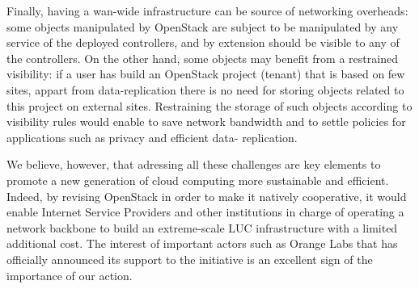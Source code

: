 Finally, having a wan-wide infrastructure can be source of networking overheads: some objects
manipulated by OpenStack are subject to be manipulated by any service of the deployed
controllers, and by extension should be visible to any of the controllers. On the other
hand, some objects may benefit from a restrained visibility: if a user has build an
OpenStack project (tenant) that is based on few sites, appart from data-replication there
is no need for storing objects related to this project on external sites. Restraining the
storage of such objects according to visibility rules would enable to save network
bandwidth and to settle policies for applications such as privacy and efficient data-
replication.

We believe, however, that adressing all these challenges are key
elements to promote a new generation of cloud computing more
sustainable and efficient. Indeed, by revising OpenStack in order to
make it natively cooperative, it would enable Internet Service Providers and other
institutions in charge of operating a network backbone to build an
extreme-scale LUC infrastructure with a limited additional cost. The
interest of important actors such as Orange Labs that has officially
announced its support to the initiative is an excellent sign of the
importance of our action.
